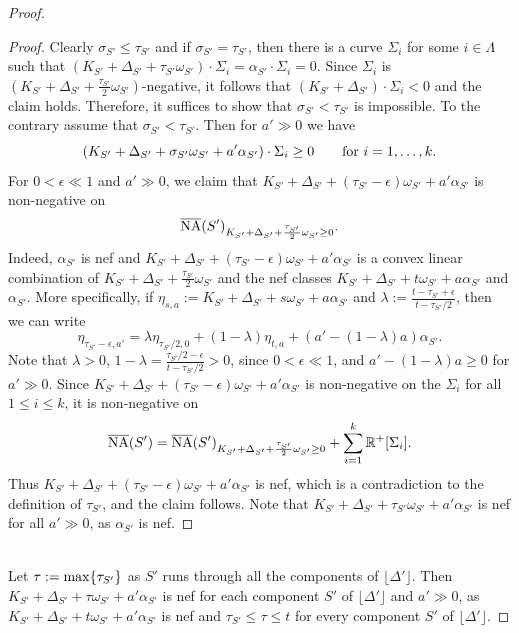 \documentclass[12pt]{amsart}
\theoremstyle{plain}
\theoremstyle{remark}
\theoremstyle{definition}
\newcommand{\<}{\leq}
\def\lrd{\lfloor}
\def\rrd{\rfloor}
\def\eps{\epsilon}
\def\lrd{\lfloor}
\def\rrd{\rfloor}
\theoremstyle{definition}
\theoremstyle{definition}
\numberwithin{equation}{section}
\theoremstyle{remark}
\begin{document}
\begin{proof}
\begin{proof}
     Clearly 
     $\sigma _{S'}\leq \tau _{S'}$ and if $\sigma _{S'}= \tau _{S'}$, then there is a curve $\Sigma _i$ for some $i\in\Lambda$ such that $(K_{S'}+\Delta _{S'}+\tau _{S'}\omega _{S'})\cdot \Sigma _i=\alpha _{S'}\cdot \Sigma _i=0$.
     Since $\Sigma_i$ is $(K_{S'}+\Delta_{S'}+\frac{\tau_{S'}}{2}\omega_{S'})$-negative, it follows that $(K_{S'}+\Delta_{S'})\cdot\Sigma_i<0$ and the claim holds. Therefore, it suffices to show that $\sigma _{S'}< \tau _{S'}$ is impossible. To the contrary assume that $\sigma _{S'}< \tau _{S'}$. Then for $a'\gg 0$ we have \[(K_{S'}+\Delta _{S'}+\sigma _{S'}\omega _{S'}+a'\alpha _{S'})\cdot \Sigma _i\geq 0\qquad {\rm for}\ i=1,\ldots, k.\]
     For $0<\epsilon \ll 1$ and $a'\gg 0$, we claim that $K_{S'}+\Delta _{S'}+(\tau _{S'}-\epsilon )\omega _{S'}+a'\alpha _{S'}$ is non-negative on \[\overline {\rm NA}(S')_{K_{S'}+\Delta _{S'}+\frac {\tau _{S'}}2\omega _{S'}\geq 0}.\] 
     Indeed, $\alpha _{S'}$ is nef and $K_{S'}+\Delta _{S'}+(\tau _{S'}-\epsilon )\omega _{S'}+a'\alpha _{S'}$ is a convex linear combination of $K_{S'}+\Delta _{S'}+\frac {\tau _{S'}}2\omega _{S'}$ and the nef classes $K_{S'}+\Delta _{S'}+t\omega _{S'}+a\alpha _{S'}$ and $\alpha _{S'}$. More specifically,  if $\eta _{s,a}:= K_{S'}+\Delta _{S'}+s\omega _{S'}+a\alpha _{S'}$ and $\lambda:=\frac {t-\tau _{S'}+\epsilon}{t-\tau _{S'}/2}$, then we can write \[\eta_{\tau _{S'}-\epsilon ,a'} =\lambda  \eta_{{\tau _{S'}}/2,0}+(1-\lambda) \eta_{t,a} +(a'-(1-\lambda)a)\alpha _{S'}.\]
     Note that $\lambda >0$,  $1-\lambda=\frac {\tau _{S'}/2-\epsilon}{t-\tau _{S'}/2}>0$, since $0<\eps\ll 1$, and $a'-(1-\lambda)a \geq 0$ for $a'\gg 0$.
     Since  $K_{S'}+\Delta _{S'}+(\tau _{S'}-\epsilon )\omega _{S'}+a'\alpha _{S'}$ is non-negative on the $\Sigma _i$ for all $1\<i\<k$, it is non-negative on 
     \[ \overline {\rm NA}(S')=\overline {\rm NA}(S')_{K_{S'}+\Delta _{S'}+\frac {\tau _{S'}}2\omega _{S'}\geq 0}+\sum _{i=1}^k \mathbb R^+[\Sigma _i].\]
     Thus $K_{S'}+\Delta _{S'}+(\tau _{S'}-\epsilon )\omega _{S'}+a'\alpha _{S'}$ is nef, which is a contradiction to the definition of $\tau_{S'}$, and the claim follows.
     Note that  $K_{S'}+\Delta _{S'}+\tau _{S'}\omega _{S'}+a'\alpha _{S'}$ is nef for all $a'\gg 0$, as $\alpha_{S'}$ is nef.
 \end{proof}~\\
 

Let $\tau:={\rm max}\{\tau _{S'}\}$ as $S'$ runs through all the components of  $\lfloor \Delta '\rfloor$. Then $K_{S'}+\Delta _{S'}+\tau\omega _{S'}+a'\alpha _{S'}$ is nef for each component $S'$ of  $\lfloor \Delta '\rfloor$ and $a'\gg 0$, as $K_{S'}+\Delta_{S'}+t\omega_{S'}+a'\alpha_{S'}$ is nef and $\tau_{S'}\<\tau\<t$ for every component $S'$ of $\lrd\Delta'\rrd$.


\end{proof}
\end{document}
